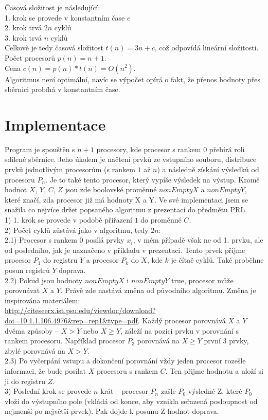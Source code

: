 \documentclass[11pt]{article}
\begin{document}
Časová složitost je následující:\\
1. krok se provede v konstantním čase $c$\\
2. krok trvá $2n$ cyklů\\
3. krok trvá $n$ cyklů\\
Celkově je tedy časová složitost $t(n) = 3n + c$, což odpovídá lineární složitosti.\\
Počet procesorů $p(n) = n + 1$. \\
Cena $c(n) = p(n) * t(n) = O(n^2)$.\\
Algoritmus není optimální, navíc se výpočet opírá o fakt, že přenos hodnoty přes sběrnici probíhá v konstantním čase.

\section{Implementace}
Program je spouštěn s $n+1$ procesory, kde procesor s rankem $0$ přebírá roli sdílené sběrnice. Jeho úkolem je načtení prvků ze vstupního souboru, distribuce prvků jednotlivým procesorům (s rankem $1$ až $n$) a následně získání výsledků od procesoru $P_n$.
Je to také tento procesor, který vypíše výsledek na výstup.
Kromě hodnot $X$, $Y$, $C$, $Z$ jsou zde boolovské proměnné $nonEmptyX$ a $nonEmptyY$, které značí, zda procesor již má hodnoty X a Y.
Ve své implementaci jsem se snažila co nejvíce držet popsaného algoritmu z prezentací do předmětu PRL.\\
1) 1. krok se provede v podobě přiřazení $1$ do proměnné $C$.\\
2) Počet cyklů zůstává jako v algoritmu, tedy $2n$:\\
2.1) Procesor s rankem $0$ posílá prvky $x_i$, v mém případě však ne od 1. prvku, ale od posledního, jak je naznačeno v příkladu v prezentaci.
Tento prvek přijme procesor $P_1$ do registru $Y$ a procesor $P_k$ do $X$, kde $k$ je čítač cyklů. Také proběhne posun registrů $Y$ doprava.\\
2.2) Pokud jsou hodnoty $nonEmptyX$ i $nonEmptyY$ true, procesor může porovnávat $X$ a $Y$. Právě zde nastává změna od původního algoritmu.
Změna je inspirována materiálem:\\ \url{http://citeseerx.ist.psu.edu/viewdoc/download?doi=10.1.1.106.4976&rep=rep1&type=pdf}.
Každý procesor porovnává $X$ a $Y$ dvěma způsoby -- $X > Y$ nebo $X \geq Y$, záleží na pozici prvku v porovnání s rankem procesoru.
Například procesor $P_3$ porovnává na $X \geq Y$ první $3$ prvky, zbylé porovnává na $X > Y$.\\
2.3) Po vyčerpání vstupu a dokončení porovnání vždy jeden procesor rozešle informaci, že bude posílat $X$ procesoru s rankem $C$. Ten přijme hodnotu a uloží si ji do registru $Z$.\\
3) Poslední krok se provede $n$ krát -- procesor $P_n$ zašle $P_0$ výsledné Z, které $P_0$ vloží do výstupního pole (vkládá od konce, aby vznikla
seřazená posloupnost od nejmenší po největší prvek). Pak dojde k posunu Z hodnot doprava.
\end{document}
